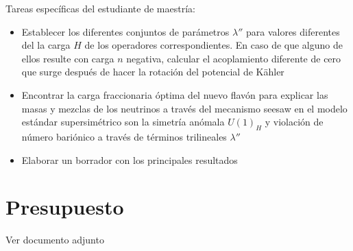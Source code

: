 \documentclass[11pt]{article}
\begin{document}
Tareas específicas del estudiante de maestría:
\begin{itemize}
\item Establecer los diferentes conjuntos de parámetros $\lambda''$ para valores diferentes del la carga $H$ de los operadores correspondientes. En caso de que alguno de ellos resulte con carga $n$ negativa, calcular el acoplamiento diferente de cero que surge después de hacer la rotación del potencial de K\"ahler
\item Encontrar la carga fraccionaria óptima del nuevo flavón para explicar las masas y mezclas de los neutrinos a través del mecanismo seesaw en el modelo estándar supersimétrico son la simetría anómala $U(1)_H$ y violación de número bariónico a través de términos trilineales $\lambda''$
\item Elaborar un borrador con los principales resultados
\end{itemize}



\section{ Presupuesto}

Ver documento adjunto


\end{document}
